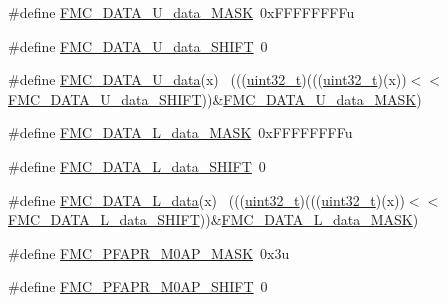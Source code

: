 \begin{DoxyCompactItemize}
\item 
\#define \hyperlink{group___f_m_c___register___masks_gae43292c4f0149b2bc25d115b7f5a6ee9}{F\+M\+C\+\_\+\+D\+A\+T\+A\+\_\+\+U\+\_\+data\+\_\+\+M\+A\+SK}~0x\+F\+F\+F\+F\+F\+F\+F\+Fu
\item 
\#define \hyperlink{group___f_m_c___register___masks_gaa7a3b8bfa7aac03f2eef0b5e58dfbb44}{F\+M\+C\+\_\+\+D\+A\+T\+A\+\_\+\+U\+\_\+data\+\_\+\+S\+H\+I\+FT}~0
\item 
\#define \hyperlink{group___f_m_c___register___masks_gaaff6334ea97d75b928e57b18784450ba}{F\+M\+C\+\_\+\+D\+A\+T\+A\+\_\+\+U\+\_\+data}(x)                                          ~(((\hyperlink{_p_e___types_8h_a33594304e786b158f3fb30289278f5af}{uint32\+\_\+t})(((\hyperlink{_p_e___types_8h_a33594304e786b158f3fb30289278f5af}{uint32\+\_\+t})(x))$<$$<$\hyperlink{group___f_m_c___register___masks_gaa7a3b8bfa7aac03f2eef0b5e58dfbb44}{F\+M\+C\+\_\+\+D\+A\+T\+A\+\_\+\+U\+\_\+data\+\_\+\+S\+H\+I\+FT}))\&\hyperlink{group___f_m_c___register___masks_gae43292c4f0149b2bc25d115b7f5a6ee9}{F\+M\+C\+\_\+\+D\+A\+T\+A\+\_\+\+U\+\_\+data\+\_\+\+M\+A\+SK})
\item 
\#define \hyperlink{group___f_m_c___register___masks_gaefcb45152ed3dc9c4ac7b353f4eab44b}{F\+M\+C\+\_\+\+D\+A\+T\+A\+\_\+\+L\+\_\+data\+\_\+\+M\+A\+SK}~0x\+F\+F\+F\+F\+F\+F\+F\+Fu
\item 
\#define \hyperlink{group___f_m_c___register___masks_gabef8366f6d036877a0600a2594f08bfb}{F\+M\+C\+\_\+\+D\+A\+T\+A\+\_\+\+L\+\_\+data\+\_\+\+S\+H\+I\+FT}~0
\item 
\#define \hyperlink{group___f_m_c___register___masks_ga42e9ba3dd387406fe69e41f80a1ad70f}{F\+M\+C\+\_\+\+D\+A\+T\+A\+\_\+\+L\+\_\+data}(x)                                          ~(((\hyperlink{_p_e___types_8h_a33594304e786b158f3fb30289278f5af}{uint32\+\_\+t})(((\hyperlink{_p_e___types_8h_a33594304e786b158f3fb30289278f5af}{uint32\+\_\+t})(x))$<$$<$\hyperlink{group___f_m_c___register___masks_gabef8366f6d036877a0600a2594f08bfb}{F\+M\+C\+\_\+\+D\+A\+T\+A\+\_\+\+L\+\_\+data\+\_\+\+S\+H\+I\+FT}))\&\hyperlink{group___f_m_c___register___masks_gaefcb45152ed3dc9c4ac7b353f4eab44b}{F\+M\+C\+\_\+\+D\+A\+T\+A\+\_\+\+L\+\_\+data\+\_\+\+M\+A\+SK})
\item 
\#define \hyperlink{group___f_m_c___register___masks_gac1ee4a2aca52fe6f68d05ce0b43dd6b8}{F\+M\+C\+\_\+\+P\+F\+A\+P\+R\+\_\+\+M0\+A\+P\+\_\+\+M\+A\+SK}~0x3u
\item 
\#define \hyperlink{group___f_m_c___register___masks_gaff9b97ca7b6e58fe7aa92c088e2f2fe1}{F\+M\+C\+\_\+\+P\+F\+A\+P\+R\+\_\+\+M0\+A\+P\+\_\+\+S\+H\+I\+FT}~0

\end{DoxyCompactItemize}
